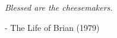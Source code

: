 
\vspace*{\fill}
\begin{center}
\textit{Blessed are the cheesemakers.}\par
\end{center}
\vspace*{\fill}
\begin{flushright}
- The Life of Brian (1979)
\end{flushright}
